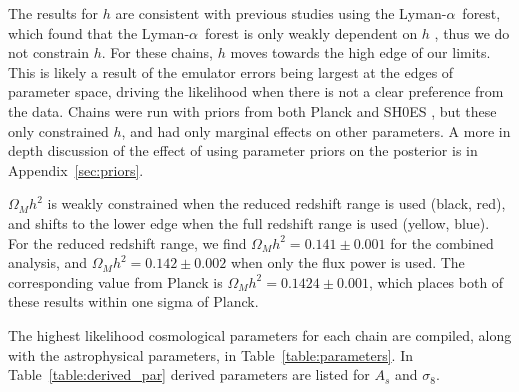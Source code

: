 \documentclass[a4paper,11pt]{article}
\newcommand{\lya}{Lyman-$\alpha$\ }
\begin{document}
The results for $h$ are consistent with previous studies using the \lya forest, which found that the \lya forest is only weakly dependent on $h$ \cite{2015JCAP...11..011P, 2020JCAP...04..038P}, thus we do not constrain $h$.
For these chains, $h$ moves towards the high edge of our limits.
This is likely a result of the emulator errors being largest at the edges of parameter space, driving the likelihood when there is not a clear preference from the data.
Chains were run with priors from both Planck \cite{2020A&A...641A...6P} and SH0ES \cite{2022ApJ...934L...7R}, but these only constrained $h$, and had only marginal effects on other parameters.
A more in depth discussion of the effect of using parameter priors on the posterior is in Appendix~\ref{sec:priors}.

$\Omega_M h^2$ is weakly constrained when the reduced redshift range is used (black, red), and shifts to the lower edge when the full redshift range is used (yellow, blue).
For the reduced redshift range, we find $\Omega_M h^2 = 0.141\pm0.001$ for the combined analysis, and $\Omega_M h^2 = 0.142\pm0.002$ when only the flux power is used.
The corresponding value from Planck is $\Omega_M h^2 = 0.1424\pm0.001$, which places both of these results within one sigma of Planck.

The highest likelihood cosmological parameters for each chain are compiled, along with the astrophysical parameters, in Table~\ref{table:parameters}.
In Table~\ref{table:derived_par} derived parameters are listed for $A_s$ and $\sigma_8$.
\end{document}
